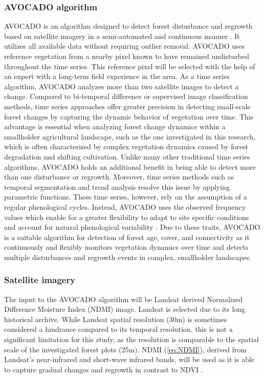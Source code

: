 \subsubsection{AVOCADO algorithm}
AVOCADO is an algorithm designed to detect forest disturbance and regrowth based on satellite imagery in a semi-automated and continuous manner \citep{decuyperContinuousMonitoringForest2022}. It utilizes all available data without requiring outlier removal. AVOCADO uses reference vegetation from a nearby pixel known to have remained undisturbed throughout the time series. This reference pixel will be selected with the help of an expert with a long-term field experience in the area. As a time series algorithm, AVOCADO analyzes more than two satellite images to detect a change. Compared to bi-temporal difference or supervised image classification methods, time series approaches offer greater precision in detecting small-scale forest changes by capturing the dynamic behavior of vegetation over time. This advantage is essential when analyzing forest change dynamics within a smallholder agricultural landscape, such as the one investigated in this research, which is often characterized by complex vegetation dynamics caused by forest degradation and shifting cultivation. Unlike many other traditional time series algorithms, AVOCADO holds an additional benefit in being able to detect more than one disturbance or regrowth. Moreover, time series methods such as temporal segmentation and trend analysis resolve this issue by applying parametric functions. These time series, however, rely on the assumption of a regular phenological cycles. Instead, AVOCADO uses the observed frequency values which enable for a greater flexibility to adapt to site specific conditions and account for natural phenological variability \citep{decuyperContinuousMonitoringForest2022}. Due to these traits, AVOCADO is a suitable algorithm for detection of forest age, cover, and connectivity as it continuously and flexibly monitors vegetation dynamics over time and detects multiple disturbances and regrowth events in complex, smallholder landscapes.

\subsubsection{Satellite imagery}
The input to the AVOCADO algorithm will be Landsat derived Normalized Difference Moisture Index (NDMI) image. Landsat is selected due to its long historical archive. While Landsat spatial resolution (30m) is sometimes considered a hindrance compared to its temporal resolution, this is not a significant limitation for this study, as the resolution is comparable to the spatial scale of the investigated forest plots (25m). NDMI (\ref{eq:NDMI}), derived from Landsat's near-infrared and short-wave infrared bands, will be used as it is able to capture gradual changes and regrowth in contrast to NDVI \citep{vermotePreliminaryAnalysisPerformance2016}. 

